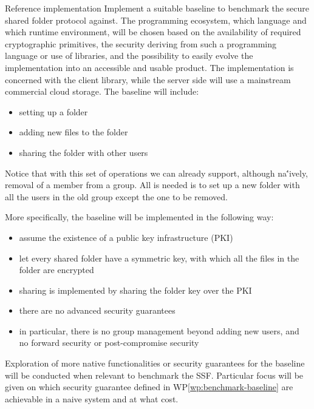 \documentclass[E]{BAMASA}
\begin{document}
\begin{workpackage}{Reference implementation}\label{wp:benchmark-baseline}
	Implement a suitable baseline to benchmark the secure shared folder protocol against.
    The programming ecosystem, which language and which runtime environment, will be 
    chosen based on the availability of required cryptographic primitives, 
    the security deriving from such a programming language or use of libraries,
    and the possibility to easily evolve the implementation into an accessible and usable product.
    The implementation is concerned with the client library, while the server side will use a 
    mainstream commercial cloud storage.
    The baseline will include:
    \begin{itemize}
		\item setting up a folder
		\item adding new files to the folder
		\item sharing the folder with other users
	\end{itemize}
    Notice that with this set of operations we can already support, although na\''ively, removal of 
    a member from a group. All is needed is to set up a new folder with all the users in the old group
    except the one to be removed.

    More specifically, the baseline will be implemented in the following way:
    \begin{itemize}
        \item assume the existence of a public key infrastructure (PKI)
        \item let every shared folder have a symmetric key, with which all the files in the 
                folder are encrypted
        \item sharing is implemented by sharing the folder key over the PKI
        \item there are no advanced security guarantees
        \item in particular, there is no group management beyond adding new users, and no forward 
                security or post-compromise security
    \end{itemize}

    Exploration of more native functionalities or security guarantees for the baseline will be conducted 
    when relevant to benchmark the SSF. Particular focus will be given on which security guarantee 
    defined in WP\ref{wp:benchmark-baseline} are achievable in a naive system and at what cost.

\end{workpackage}
\end{document}
